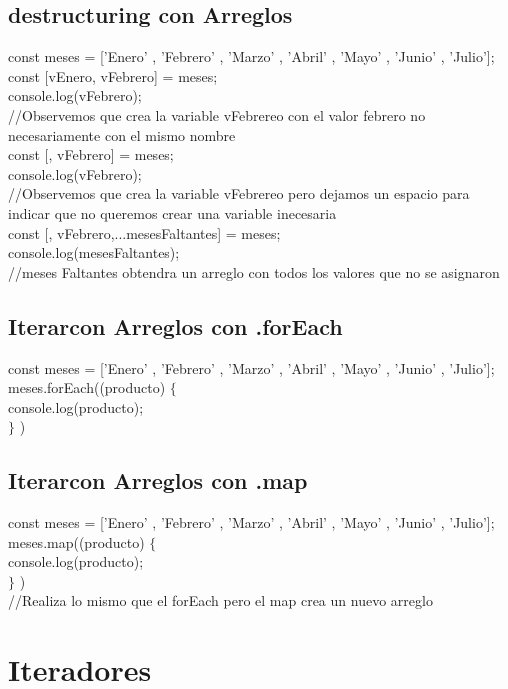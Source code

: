 \documentclass[10pt,a4paper]{article}
\begin{document}
\newpage
\subsection{destructuring con Arreglos} 
const meses = ['Enero' , 'Febrero' , 'Marzo' , 'Abril' , 'Mayo' , 'Junio' , 'Julio']; \\
const [vEnero, vFebrero] = meses;\\
console.log(vFebrero); \\
//Observemos que crea la variable vFebrereo con el valor febrero no necesariamente con el mismo nombre \\
const [, vFebrero] = meses;\\
console.log(vFebrero); \\
//Observemos que crea la variable vFebrereo pero dejamos un espacio para indicar que no queremos crear una variable inecesaria\\
const [, vFebrero,...mesesFaltantes] = meses;\\
console.log(mesesFaltantes); \\
//meses Faltantes obtendra un arreglo con todos los valores que no se asignaron\\

\subsection{Iterarcon Arreglos con .forEach} 
const meses = ['Enero' , 'Febrero' , 'Marzo' , 'Abril' , 'Mayo' , 'Junio' , 'Julio']; \\
meses.forEach((producto) $ \{ $ \\ 
console.log(producto); \\ 
$\} $ )\\
\subsection{Iterarcon Arreglos con .map} 
const meses = ['Enero' , 'Febrero' , 'Marzo' , 'Abril' , 'Mayo' , 'Junio' , 'Julio']; \\
meses.map((producto) $ \{ $ \\ 
console.log(producto); \\ 
$\} $ )\\
//Realiza lo mismo que el forEach pero el map crea un nuevo arreglo\\

\newpage
\section{Iteradores}
\end{document}
